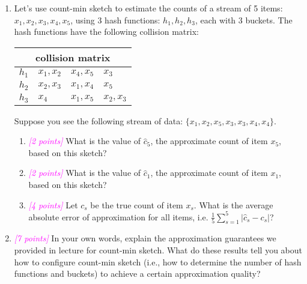 \documentclass{exam}
\newcommand{\grade}[1]{\small\textcolor{magenta}{\emph{[#1 points]}} \normalsize}
\begin{document}
\begin{enumerate}[label=(\alph*)]

\item Let's use count-min sketch to estimate the counts of a stream of 5 items: $x_1, x_2, x_3, x_4, x_5$, using 3 hash functions: $h_1, h_2, h_3$, each with 3 buckets. The hash functions have the following collision matrix: 

\begin{center}
\begin{tabular}{ |p{3cm}||p{3cm}|p{3cm}|p{3cm}|  }
 \hline
 \multicolumn{4}{|c|}{collision matrix} \\
 \hline
 $h_1$   & $x_1, x_2$    &$x_4, x_5$ &   $x_3$ \\
 \hline
 $h_2$&   $x_2, x_3$  & $x_1, x_4$   & $x_5$ \\
 \hline
$h_3$ & $x_4$ & $x_1, x_5$ &  $x_2, x_3$ \\
 \hline
\end{tabular}
\end{center} \hspace{0pt}

Suppose you see the following stream of data: $\{x_1, x_2, x_5, x_3, x_3, x_4, x_4\}$.

\begin{enumerate}[label=\roman*.]
    \item \grade{2} What is the value of $\hat{c}_5$, the approximate count of item $x_5$, based on this sketch? 
    
    \vspace{2em} 
    \item \grade{2} What is the value of $\hat{c}_1$, the approximate count of item $x_1$, based on this sketch?
    
    \vspace{2em} 
    \item \grade{4} Let $c_s$ be the true count of item $x_s$. What is the average absolute error of approximation for all items, i.e. $\frac{1}{5}\sum_{s=1}^5|\hat{c}_s-c_s|$?
    
    \vspace{3em}
    
\end{enumerate}


\item \grade{7} In your own words, explain the approximation guarantees we provided in lecture for count-min sketch. What do these results tell you about how to configure count-min sketch (i.e., how to determine the number of hash functions and buckets) to achieve a certain approximation quality?

\end{enumerate}
\end{document}
